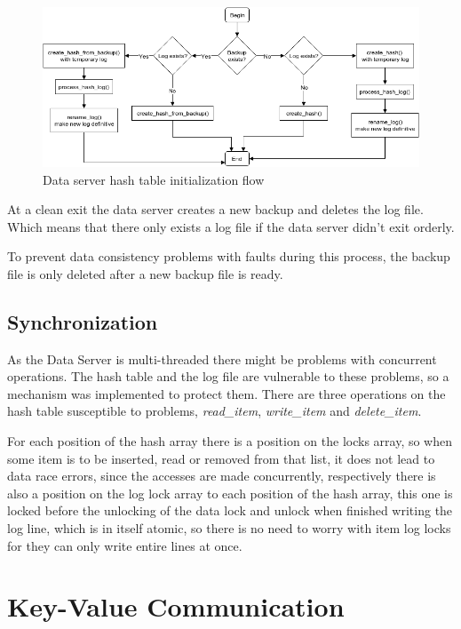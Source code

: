 \documentclass[12pt]{article} %
\begin{document}
\begin{figure}[H]
\centering
\includegraphics[width=\textwidth]{./Pictures/BackupLogFlow.png}
\caption{Data server hash table initialization flow}\label{fig:BackupLogFlow}
\end{figure}

At a clean exit the data server creates a new backup and deletes the log file.
Which means that there only exists a log file if the data server didn't exit orderly.

To prevent data consistency problems with faults during this process, the
backup file is only deleted after a new backup file is ready.

\subsection{Synchronization}
\label{sub:Synchronization}

As the Data Server is multi-threaded there might be problems with concurrent operations.
The hash table and the log file are vulnerable to these problems, so a mechanism was implemented to protect them.
There are three operations on the hash table susceptible to problems, \emph{read_item}, \emph{write_item} and \emph{delete_item}.

For each position of the hash array there is a position on the locks array,
so when some item is to be inserted, read or removed from that list, it does not
lead to data race errors, since the accesses are made concurrently, respectively
there is also a position on the log lock array to each position of the hash array,
this one is locked before the unlocking of the data lock and unlock when finished
writing the log line, which is in itself atomic, so there is no need to worry with
item log locks for they can only write entire lines at once.

\section{Key-Value Communication}
\end{document}
